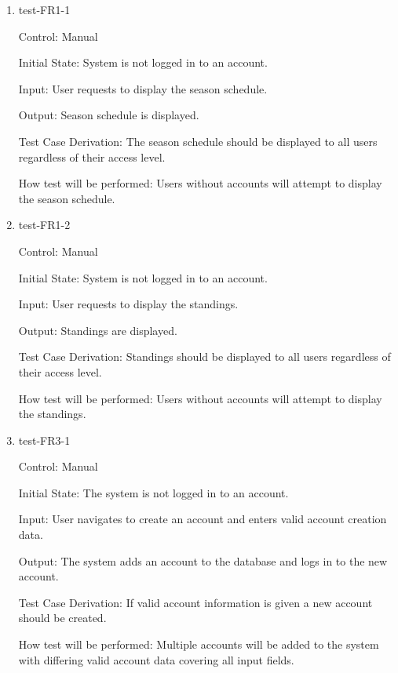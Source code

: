 \documentclass[12pt, titlepage]{article}
\begin{document}
\begin{enumerate}

  \item{test-FR1-1\\}


  Control: Manual
           
  Initial State: System is not logged in to an account.
           
  Input: User requests to display the season schedule.
           
  Output: Season schedule is displayed.
 
  Test Case Derivation: The season schedule should be displayed to all users
  regardless of their access level.
 
  How test will be performed: Users without accounts will attempt to display
  the season schedule.

  \item{test-FR1-2\\}


  Control: Manual
           
  Initial State: System is not logged in to an account.
           
  Input: User requests to display the standings.
           
  Output: Standings are displayed.
 
  Test Case Derivation: Standings should be displayed to all users
  regardless of their access level.
 
  How test will be performed: Users without accounts will attempt to display
  the standings.

  \item{test-FR3-1\\}

  Control: Manual
            
  Initial State: The system is not logged in to an account.
            
  Input: User navigates to create an account and enters valid account creation
  data.
            
  Output: The system adds an account to the database and logs in to the new
  account.
  
  Test Case Derivation: If valid account information is given a new account
  should be created.
  
  How test will be performed: Multiple accounts will be added to the system
  with differing valid account data covering all input fields.


\end{enumerate}
\end{document}
